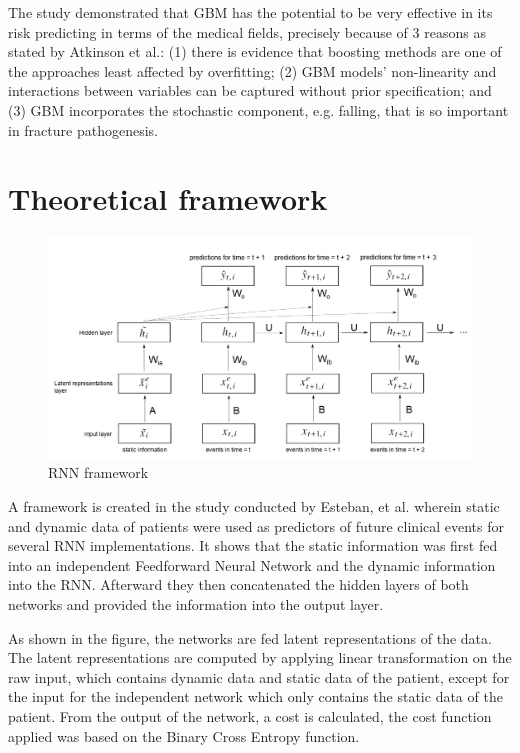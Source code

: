 \documentclass[10pt,11pt,12pt,oneside]{book}
\begin{document}
        The study demonstrated that GBM has the potential to be very effective in its risk predicting in terms of the medical fields, precisely because of 3 reasons as stated by Atkinson et al.: (1) there is evidence that boosting methods are one of the approaches least affected by overfitting; (2) GBM models’ non-linearity and interactions between variables can be captured without prior specification; and (3) GBM incorporates the stochastic component, e.g. falling, that is so important in fracture pathogenesis. \cite{Atkinson2012}
   \pagebreak
    \section{Theoretical framework}
    \begin{figure} [ht]
        \includegraphics[width=6.5in]{rnnframework.png}
        \caption{RNN framework}
        \medskip
    \end{figure}
    A framework is created in the study conducted by Esteban, et al. wherein static and dynamic data of patients were used as predictors of future clinical events for several RNN implementations. It shows that the static information was first fed into an independent Feedforward Neural Network and the dynamic information into the RNN. Afterward they then concatenated the hidden layers of both networks and provided the information into the output layer.
    
    As shown in the figure, the networks are fed latent representations of the data. The latent representations are computed by applying linear transformation on the raw input, which contains dynamic data and static data of the patient, except for the input for the independent network which only contains the static data of the patient. From the output of the network, a cost is calculated, the cost function applied was based on the Binary Cross Entropy function. \cite{DBLP:journals/corr/EstebanSYT16}
    \FloatBarrier
\end{document}
